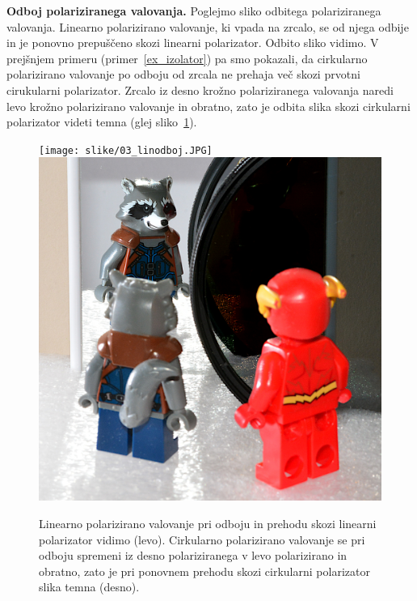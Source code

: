 \begin{example}{\bf Odboj polariziranega valovanja.}
Poglejmo sliko odbitega polariziranega valovanja. Linearno polarizirano
valovanje, ki vpada na zrcalo, se od njega odbije in je ponovno
prepuščeno skozi linearni polarizator. Odbito sliko vidimo. 
V prejšnjem primeru (primer~\ref{ex_izolator})
pa smo pokazali, da cirkularno polarizirano valovanje po odboju 
od zrcala ne prehaja več skozi prvotni cirukularni 
polarizator. Zrcalo iz desno krožno polariziranega valovanja naredi
levo krožno polarizirano valovanje in obratno, zato je odbita
slika skozi cirkularni polarizator videti 
temna (glej sliko~\ref{fig:03_CirkularniOdboj}). 
\begin{figure}[h!]
\centering
\texttt{[image: slike/03\_linodboj.JPG]}\hfill
\includegraphics[width=7truecm]{slike/03_circodboj.JPG}
\caption{Linearno polarizirano valovanje pri odboju in prehodu skozi linearni polarizator
vidimo (levo). Cirkularno polarizirano valovanje se pri odboju spremeni iz 
desno polariziranega v levo polarizirano in obratno, zato je pri ponovnem 
prehodu skozi cirkularni polarizator slika temna (desno).}
\label{fig:03_CirkularniOdboj}
\end{figure}
\end{example}

